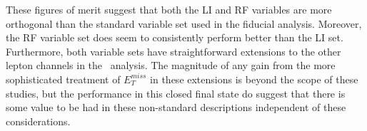 \begin{comment}
A summary of performance metrics in this document may be found in Table \ref{tab:kahuna}.  


\begin{table}[!htbp]\captionsetup{justification=centering}
\caption{Summary of performance figures for the standard, LI, and RF variable sets.  In the case of the latter two, \% differences are given where relevant.  Differences in errors on $\mu$ are on full systematics and total error, respectively.}
\begin{center}
\begin{tabular}{lccc}
\hline\hline
 & Standard &LI &RF\\
\hline
$\hat{\mu}$ & $1.75^{+0.24}_{-0.23}(\textrm{stat.})^{+0.34}_{-0.28}(\textrm{syst.})$ & $1.65^{+0.24}_{-0.23}(\textrm{stat.})^{+0.34}_{-0.28}(\textrm{syst.})$ & $1.50^{+0.24}_{-0.23}(\textrm{stat.})^{+0.34}_{-0.28}(\textrm{syst.})$\\
Asi. $\Delta err\left(\mu\right)$ &  --- & $<1$\%, +4.6\% & -6.5\%, -2.2\%\\
Obs. $\Delta err\left(\hat{\mu}\right)$ &  --- & -7.5\%, -3.7\% & -16\%, -8.8\%\\
\hline
Stat only sig. & 4.78 & 4.39 (-7.9\%) & 4.44 (-6.9\%)\\
Exp. (Asi.) sig. & 2.06 & 1.92 (-6.7\%) & 2.13 (+3.5\%)\\
Exp. (data) sig. & 1.76 & 1.73 (-1.7\%) & 1.80 (+3.4\%)\\
Obs. (data) sig. & 2.87 & 2.79 (-2.8\%) & 2.62 (-8.6\%)\\
\hline\hline
\end{tabular}
\end{center}
\label{tab:kahuna}
\end{table}
\end{comment}

These figures of merit suggest that both the LI and RF variables are more orthogonal than the standard variable set used in the fiducial analysis.  Moreover, the RF variable set does seem to consistently perform better than the LI set.  Furthermore, both variable sets have straightforward extensions to the other lepton channels in the \vhbb\, analysis.  The magnitude of any gain from the more sophisticated treatment of $E_T^{miss}$ in these extensions is beyond the scope of these studies, but the performance in this closed final state do suggest that there is some value to be had in these non-standard descriptions independent of these considerations.

